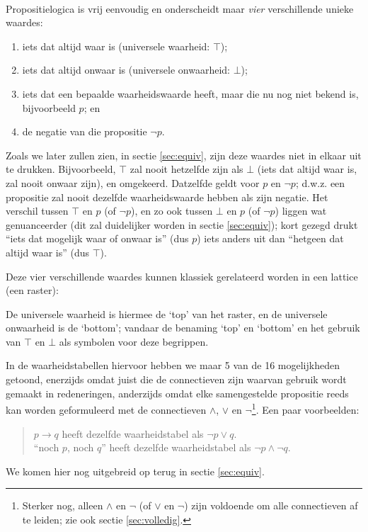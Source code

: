 \begin{aside}\mbox{}\\
Propositielogica is vrij eenvoudig en onderscheidt maar \textit{vier} verschillende unieke waardes:
\begin{enumerate}
\item iets dat altijd waar is (universele waarheid: $\top$);
\item iets dat altijd onwaar is (universele onwaarheid: $\bot$);
\item iets dat een bepaalde waarheidswaarde heeft, maar die nu nog niet bekend is, bijvoorbeeld $p$; en
\item de negatie van die propositie $\neg p$.
\end{enumerate}

\noindent
Zoals we later zullen zien, in sectie \ref{sec:equiv}, zijn deze waardes niet in elkaar uit te drukken. Bijvoorbeeld, $\top$ zal nooit hetzelfde zijn als $\bot$ (iets dat altijd waar is, zal nooit onwaar zijn), en omgekeerd. Datzelfde geldt voor $p$ en $\neg p$; d.w.z. een propositie zal nooit dezelfde waarheidswaarde hebben als zijn negatie. Het verschil tussen $\top$ en $p$ (of $\neg p$), en zo ook tussen $\bot$ en $p$ (of $\neg p$) liggen wat genuanceerder (dit zal duidelijker worden in sectie \ref{sec:equiv}); kort gezegd drukt \enquote{iets dat mogelijk waar of onwaar is} (dus $p$) iets anders uit dan \enquote{hetgeen dat altijd waar is} (dus $\top$).

Deze vier verschillende waardes kunnen klassiek gerelateerd worden in een lattice (een raster):
\begin{center}
\end{center}
De universele waarheid is hiermee de `top' van het raster, en de universele onwaarheid is de `bottom'; vandaar de benaming `top' en `bottom' en het gebruik van $\top$ en  $\bot$ als symbolen voor deze begrippen.
\end{aside}

In de waarheidstabellen hiervoor hebben we maar 5 van de 16 mogelijkheden getoond, enerzijds omdat juist die de connectieven zijn waarvan gebruik wordt gemaakt in redeneringen, anderzijds omdat elke samengestelde propositie reeds kan worden geformuleerd met de connectieven $\land$, $\lor$ en $\neg$\footnote{Sterker nog, alleen $\land$ en $\neg$ (of $\lor$ en $\neg$) zijn voldoende om alle connectieven af te leiden; zie ook sectie \ref{sec:volledig}.}. Een paar voorbeelden:
\begin{quote}
$p\rightarrow q$ heeft dezelfde waarheidstabel als $\neg p\lor q$.\\
\enquote{noch $p$, noch $q$} heeft dezelfde waarheidstabel als $\neg p\land\neg q$.
\end{quote}
We komen hier nog uitgebreid op terug in sectie \ref{sec:equiv}.

